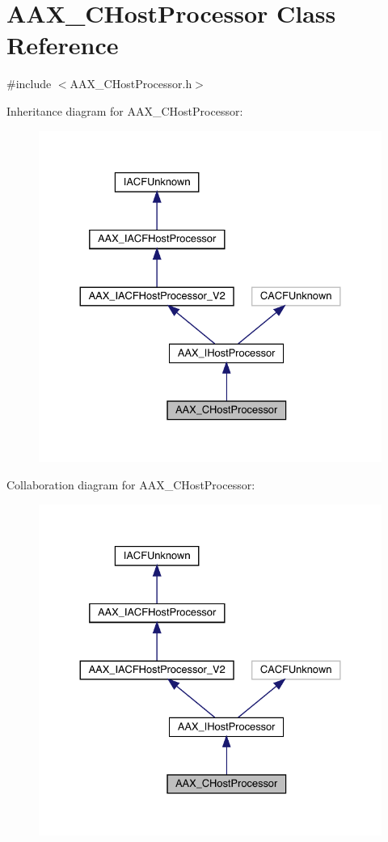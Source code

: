 \hypertarget{a01485}{}\section{A\+A\+X\+\_\+\+C\+Host\+Processor Class Reference}
\label{a01485}


{\ttfamily \#include $<$A\+A\+X\+\_\+\+C\+Host\+Processor.\+h$>$}



Inheritance diagram for A\+A\+X\+\_\+\+C\+Host\+Processor\+:
\nopagebreak
\begin{figure}[H]
\begin{center}
\leavevmode
\includegraphics[width=330pt]{a01484}
\end{center}
\end{figure}


Collaboration diagram for A\+A\+X\+\_\+\+C\+Host\+Processor\+:
\nopagebreak
\begin{figure}[H]
\begin{center}
\leavevmode
\includegraphics[width=330pt]{a01483}
\end{center}
\end{figure}


